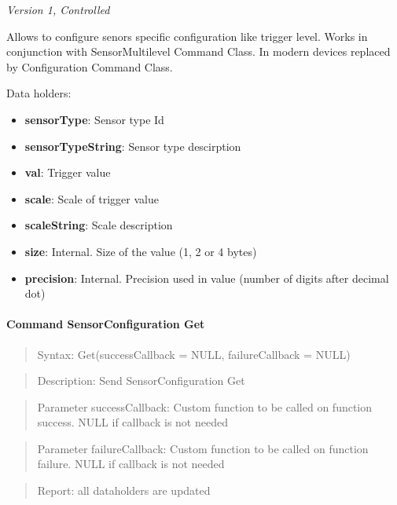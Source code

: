 \textit{Version 1, Controlled}
\newline

Allows to configure senors specific configuration like trigger level. Works in conjunction with SensorMultilevel Command Class. In modern devices replaced by Configuration Command Class.
\newline

\noindent
Data holders:

\begin{itemize}
\item \textbf{sensorType}: Sensor type Id
\item \textbf{sensorTypeString}: Sensor type descirption
\item \textbf{val}: Trigger value
\item \textbf{scale}: Scale of trigger value
\item \textbf{scaleString}: Scale description
\item \textbf{size}: Internal. Size of the value (1, 2 or 4 bytes)
\item \textbf{precision}: Internal. Precision used in value (number of digits after decimal dot)
\end{itemize}

\paragraph{Command SensorConfiguration Get}
\begin{quote}Syntax: Get(successCallback = NULL, failureCallback = NULL)\end{quote}
\begin{quote}Description: Send SensorConfiguration Get\end{quote}
\begin{quote}Parameter successCallback: Custom function to be called on function success. NULL if callback is not needed\end{quote}
\begin{quote}Parameter failureCallback: Custom function to be called on function failure. NULL if callback is not needed\end{quote}
\begin{quote}Report: all dataholders are updated\end{quote}

